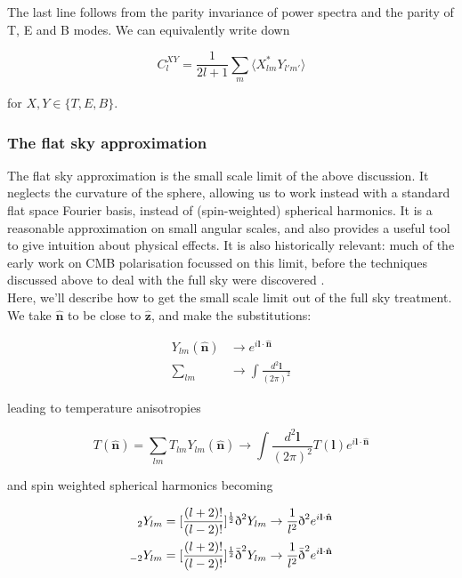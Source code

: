 \documentclass[a4paper,10pt]{article}
\renewcommand{\v}[1]{\mathbf{#1}}
\newcommand{\half}{\frac{1}{2}}
\newcommand{\finttwo}[1]{\int \frac{d^2 \v{#1}}{(2\pi)^2}}
\newcommand{\unit}[1]{\hat{\v{#1}}}
\newcommand{\sr}{\text{\normalfont\dh}}
\renewcommand{\sl}{\bar{\text{\normalfont\dh}}}
\newcommand{\ltwo}{[\frac{(l+2)!}{(l-2)!}]}
\begin{document}
The last line follows from the parity invariance of power spectra and the parity of T, E and B modes. We can equivalently write down

\begin{equation}
C_l^{XY} = \frac{1}{2l+1}\sum_m \langle X_{lm}^*Y_{l'm'}\rangle
\label{powerspectra}
\end{equation}

for $X,Y \in \{T, E,B\}$. 


\subsubsection{The flat sky approximation}

The flat sky approximation is the small scale limit of the above discussion. It neglects the curvature of the sphere, allowing us to work instead with a standard flat space Fourier basis, instead of (spin-weighted) spherical harmonics. It is a reasonable approximation on small angular scales, and also provides a useful tool to give intuition about physical effects. It is also historically relevant: much of the early work on CMB polarisation focussed on this limit, before the techniques discussed above to deal with the full sky were discovered \cite{all-sky}.\\

Here, we'll describe how to get the small scale limit out of the full sky treatment.  We take $\unit{n}$ to be close to $\unit{z}$, and make the substitutions:

\begin{equation}
\begin{split}
Y_{lm}(\unit{n}) &\rightarrow e^{i\v{l}\cdot\unit{n}}\\
\sum_{lm} &\rightarrow \finttwo{l}
\end{split}
\end{equation}

leading to temperature anisotropies

\begin{equation}
T(\unit{n}) = \sum_{lm} T_{lm}Y_{lm}(\unit{n})\rightarrow \finttwo{l} T(\v{l})e^{i\v{l}\cdot\unit{n}}
\end{equation}

and spin weighted spherical harmonics becoming 

\begin{equation}\begin{split}
{}_2Y_{lm} &= \ltwo^\half\sr^2Y_{lm} \rightarrow \frac{1}{l^2}\sr^2e^{i\v{l}\cdot\unit{n}}\\
{}_{-2}Y_{lm} &= \ltwo^\half\sl^2Y_{lm} \rightarrow  \frac{1}{l^2}\sl^2e^{i\v{l}\cdot\unit{n}}
\end{split}\end{equation}
\end{document}
